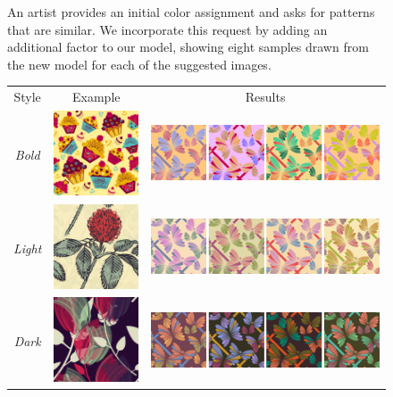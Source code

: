 \begin{figure}[ht]
\caption{An artist provides an initial color assignment and asks for patterns that are similar. We incorporate this request by adding an additional factor to our model, showing eight samples drawn from the new model for each of the suggested images.}
\label{fig:nearbySuggestions}
\vspace{-1.0em}
\end{figure}

\begin{figure}[ht]
\begin{tabular}{ccc} 
Style&Example&Results\\ %
\emph{Bold}&\includegraphics[width=.148\columnwidth]{figs/styleResultsBoldExample}&\includegraphics[width=.62\columnwidth]{figs/styleResultsBold}\vspace{0.5em}\\
\emph{Light}&\includegraphics[width=.148\columnwidth]{figs/styleResultsLightExample}&\includegraphics[width=.62\columnwidth]{figs/styleResultsLight}\vspace{0.5em}\\
\emph{Dark}&\includegraphics[width=.148\columnwidth]{figs/styleResultsDarkExample}&\includegraphics[width=.62\columnwidth]{figs/styleResultsDark}\vspace{0.5em}\\
\end{tabular}


\end{figure}
